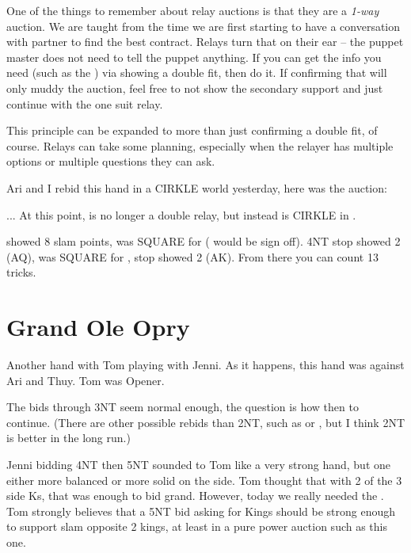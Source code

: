 \documentclass[tom-ari]{subfile}
\begin{document}
	One of the things to remember about relay auctions is that they are a \emph{1-way} auction. We are taught from the time we are first starting to have a conversation with partner to find the best contract. Relays turn that on their ear -- the puppet master does not need to tell the puppet anything.  If you can get the info you need (such as the ) via showing a double fit, then do it.  If confirming that will only muddy the auction, feel free to not show the secondary support and just continue with the one suit relay.
	
	This principle can be expanded to more than just confirming a double fit, of course. Relays can take some planning, especially when the relayer has multiple options or multiple questions they can ask.
	

	Ari and I rebid this hand in a CIRKLE world yesterday, here was the auction:
	
	
	... At this point,  is no longer a double relay, but instead is CIRKLE in \heartsuit.
	
	
	 showed 8 slam points,  was SQUARE for \heartsuit ( would be sign off). 4NT stop showed 2 (AQ),  was SQUARE for \clubsuit,  stop showed 2 (AK).  From there you can count 13 tricks.
	
	\section{Grand Ole Opry}
	 
	
	Another hand with Tom playing with Jenni. As it happens, this hand was against Ari and Thuy. Tom was Opener.
	
	The bids through 3NT seem normal enough, the question is how then to continue.  (There are other possible rebids than 2NT, such as  or , but I think 2NT is better in the long run.)
	
	Jenni bidding 4NT then 5NT sounded to Tom like a very strong hand, but one either more balanced or more solid on the side. Tom thought that with 2 of the 3 side Ks, that was enough to bid grand.  However, today we really needed the . Tom strongly believes that a 5NT bid asking for Kings should be strong enough to support slam opposite 2 kings, at least in a pure power auction such as this one.
	
\end{document}
